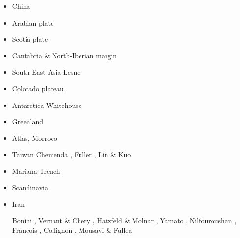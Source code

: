 \begin{itemize}
\item China 
{\scriptsize
\cite{zhst10}
\cite{wazh15}
\cite{guyr16}
\cite{dawl20}
}
\item Arabian plate 
{\scriptsize
\cite{rerl15}
}
\item Scotia plate 
{\scriptsize
\cite{necb13}
\cite{vaga20}
}
\item Cantabria \& North-Iberian margin 
{\scriptsize
\cite{clbb02}
\cite{peap15}
}
\item South East Asia 
{\scriptsize
Lesne \etal \cite{lecd00}\\
\cite{rekv04}
\cite{yotr15}\cite{hasp15}\cite{meds15}
\cite{necg16}
}
\item Colorado plateau 
{\scriptsize
\cite{vabv10}
\cite{lesm11}
}
\item Antarctica  
{\scriptsize
\cite{huha07}
Whitehouse \etal \cite{whbl12}
}
\item Greenland  
{\scriptsize
\cite{stsj15}\cite{heps15}\cite{stbl19}
}
\item Atlas, Morroco  
{\scriptsize
\cite{mica12}
\cite{kava14}
}
\item Taiwan  
{\scriptsize
Chemenda \etal \cite{chys01}, Fuller \etal \cite{fuwf06}, Lin \& Kuo \cite{liku16}
}
\item Mariana Trench  
{\scriptsize
\cite{zhlb15}
}
\item Scandinavia  
{\scriptsize
\cite{ramb80}
\cite{bovc14}
}
\item Iran

\begin{scriptsize}
Bonini \etal \cite{bocs03},
Vernant \&  Chery \cite{vech06},
Hatzfeld \& Molnar \cite{hamo10},
Yamato \etal \cite{yakm11},
Nilfouroushan \etal \cite{nipc13},
Francois \etal \cite{frba14},
Collignon \etal \cite{coyc16},
Mousavi \& Fullea \cite{mofu20}
\end{scriptsize} 
 


\end{itemize}
